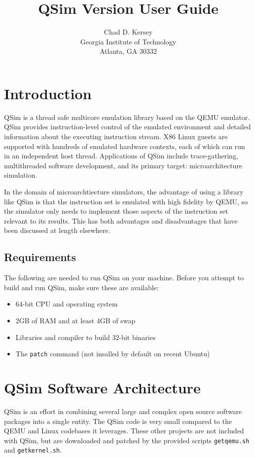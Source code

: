 \documentclass[letterpaper, 10pt]{book}
\title{QSim Version \version User Guide}
\author{Chad D. Kersey\\ Georgia Institute of Technology\\ Atlanta, GA 30332}
\begin{document}
\maketitle

\setcounter{tocdepth}{1}
\tableofcontents

\chapter*{Introduction}
QSim is a thread safe multicore emulation library based on the QEMU emulator.
QSim provides instruction-level control of the emulated environment and 
detailed information about the executing instruction stream. X86 Linux guests
are supported with hundreds of emulated hardware contexts, each of which can run
in an independent host thread. Applications of QSim include trace-gathering,
multithreaded software development, and its primary target: microarchitecture
simulation.

In the domain of microarchtiecture simulators, the advantage of using a library
like QSim is that the instruction set is emulated with high fidelity by QEMU, so
the simulator only needs to implement those aspects of the instruction set
relevant to its results. This has both advantages and disadvantages that have
been discussed at length elsewhere.


\section{Requirements}
The following are needed to run QSim on your machine. Before you attempt to build and run QSim, make sure these are available:

\begin{itemize}
  \item{64-bit CPU and operating system}
  \item{2GB of RAM and at least 4GB of swap}
  \item{Libraries and compiler to build 32-bit binaries}
  \item{The \texttt{patch} command (not insalled by default on recent Ubuntu)}
\end{itemize}

\chapter{QSim Software Architecture} \label{chap:arch}
QSim is an effort in combining several large and complex open source software
packages into a single entity. The QSim code is very small compared to the
QEMU and Linux codebases it leverages. These other projects are not included
with QSim, but are downloaded and patched by the provided scripts
\texttt{getqemu.sh} and \texttt{getkernel.sh}.
\end{document}
